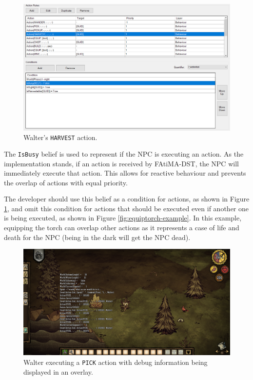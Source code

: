 \begin{figure}
  \centering
  \includegraphics[width=\textwidth]{./Images/isbusy-example}
  \caption{Walter's \texttt{HARVEST} action.}
  \label{fig:harvest-example}
\end{figure}

The \texttt{IsBusy} belief is used to represent if the \ac{NPC} is executing an action.
As the implementation stands, if an action is received by FAtiMA-DST, the \ac{NPC} will immediately execute that action.
This allows for reactive behaviour and prevents the overlap of actions with equal priority.

The developer should use this belief as a condition for actions, as shown in Figure \ref{fig:harvest-example}, and omit this condition for actions that should be executed even if another one is being executed, as shown in Figure \ref{fig:equiptorch-example}.
In this example, equipping the torch can overlap other actions as it represents a case of life and death for the \ac{NPC} (being in the dark will get the \ac{NPC} dead).

\begin{figure}
  \centering
  \includegraphics[width=\textwidth]{./Images/action-example-with-debug}
  \caption{Walter executing a \texttt{PICK} action with debug information being displayed in an overlay.}
  \label{fig:action-example-with-debug}
\end{figure}

